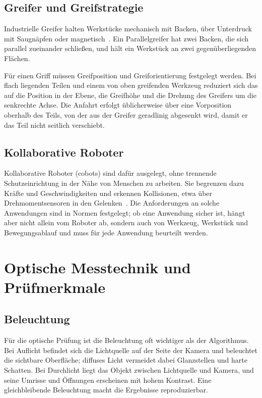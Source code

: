 \subsection{Greifer und Greifstrategie}

Industrielle Greifer halten Werkstücke mechanisch mit Backen, über Unterdruck mit
Saugnäpfen oder magnetisch~\cite{siciliano2016}. Ein Parallelgreifer hat zwei Backen, die sich
parallel zueinander schließen, und hält ein Werkstück an zwei gegenüberliegenden Flächen.

Für einen Griff müssen Greifposition und Greiforientierung festgelegt werden. Bei flach
liegenden Teilen und einem von oben greifenden Werkzeug reduziert sich das auf die Position in
der Ebene, die Greifhöhe und die Drehung des Greifers um die senkrechte Achse. Die Anfahrt
erfolgt üblicherweise über eine Vorposition oberhalb des Teils, von der aus der Greifer
geradlinig abgesenkt wird, damit er das Teil nicht seitlich verschiebt.

\subsection{Kollaborative Roboter}

Kollaborative Roboter (\ac{cobot}s) sind dafür ausgelegt, ohne trennende Schutzeinrichtung in
der Nähe von Menschen zu arbeiten. Sie begrenzen dazu Kräfte und Geschwindigkeiten und
erkennen Kollisionen, etwa über Drehmomentsensoren in den Gelenken~\cite{siciliano2016}. Die
Anforderungen an solche Anwendungen sind in Normen festgelegt; ob eine Anwendung sicher ist,
hängt aber nicht allein vom Roboter ab, sondern auch von Werkzeug, Werkstück und
Bewegungsablauf und muss für jede Anwendung beurteilt werden.


\section{Optische Messtechnik und Prüfmerkmale}
\label{sec:messtechnik}

\subsection{Beleuchtung}

Für die optische Prüfung ist die Beleuchtung oft wichtiger als der Algorithmus. Bei Auflicht
befindet sich die Lichtquelle auf der Seite der Kamera und beleuchtet die sichtbare Oberfläche;
diffuses Licht vermeidet dabei Glanzstellen und harte Schatten. Bei Durchlicht liegt das
Objekt zwischen Lichtquelle und Kamera, und seine Umrisse und Öffnungen erscheinen mit hohem
Kontrast. Eine gleichbleibende Beleuchtung macht die Ergebnisse reproduzierbar.

